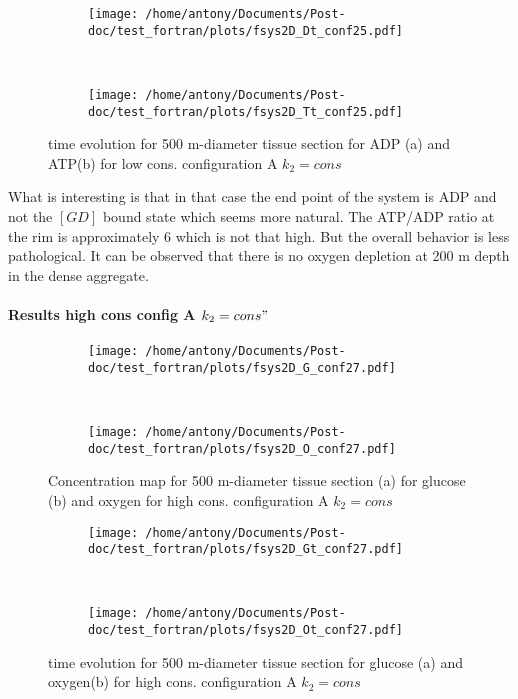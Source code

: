 \documentclass[11pt,a4paper]{article}
\begin{document}
\begin{figure}[ht!]
	\begin{subfigure}{0.45\textwidth}
	\centering
	\texttt{[image: /home/antony/Documents/Post-doc/test\_fortran/plots/fsys2D\_Dt\_conf25.pdf]}
	\caption{ \label{Dt_conf25}}
	\end{subfigure}
	~~
	\begin{subfigure}{0.45\textwidth}
	\texttt{[image: /home/antony/Documents/Post-doc/test\_fortran/plots/fsys2D\_Tt\_conf25.pdf]}
		\caption{ \label{Tt_conf25}}
	\end{subfigure}
	\caption{time evolution for 500 \textmu m-diameter tissue section  for ADP (a) and  ATP(b) for low cons. configuration A $k_2 = cons$ \label{tconf25}}
\end{figure}

What is interesting is that in that case the end point of the system is ADP and not the $[GD]$ bound state which seems more natural. The ATP/ADP ratio at the rim is approximately 6 which is not that high. But the overall behavior is less pathological. It can  be observed that there is no oxygen depletion at 200 \textmu m depth in the dense aggregate.

\paragraph{Results high cons config A $k_2 = cons"$}
\begin{figure}[ht!]
	\begin{subfigure}{0.45\textwidth}
	\centering
	\texttt{[image: /home/antony/Documents/Post-doc/test\_fortran/plots/fsys2D\_G\_conf27.pdf]}
	\caption{ \label{G_conf27}}
	\end{subfigure}
	~~
	\begin{subfigure}{0.45\textwidth}
	\texttt{[image: /home/antony/Documents/Post-doc/test\_fortran/plots/fsys2D\_O\_conf27.pdf]}
		\caption{ \label{O_conf27}}
	\end{subfigure}
	\caption{Concentration map for 500 \textmu m-diameter tissue section  (a) for glucose (b) and oxygen \label{conf27} for high cons. configuration A $k_2 = cons$}
\end{figure} 

\begin{figure}[ht!]
	\begin{subfigure}{0.45\textwidth}
	\centering
	\texttt{[image: /home/antony/Documents/Post-doc/test\_fortran/plots/fsys2D\_Gt\_conf27.pdf]}
	\caption{ \label{Gt_conf27}}
	\end{subfigure}
	~~
	\begin{subfigure}{0.45\textwidth}
	\texttt{[image: /home/antony/Documents/Post-doc/test\_fortran/plots/fsys2D\_Ot\_conf27.pdf]}
		\caption{ \label{Ot_conf27}}
	\end{subfigure}
	\caption{time evolution for 500 \textmu m-diameter tissue section  for glucose (a) and oxygen(b) for high cons. configuration A $k_2 = cons$ \label{tconf27}}
\end{figure}
\end{document}
